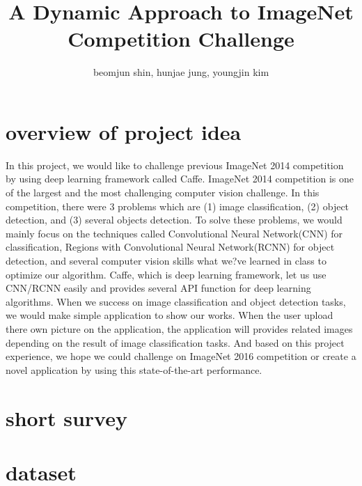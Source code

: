 

\title{A Dynamic Approach to ImageNet Competition Challenge}
\author{beomjun shin, hunjae jung, youngjin kim}

\newtheorem{qu}{Question}



\maketitle

\section{overview of project idea}

In this project, we would like to challenge previous ImageNet 2014 competition by using deep learning framework called Caffe. ImageNet 2014 competition is one of the largest and the most challenging computer vision challenge. In this competition, there were 3 problems which are (1) image classification, (2) object detection, and (3) several objects detection. To solve these problems, we would mainly focus on the techniques called Convolutional Neural Network(CNN) for classification, Regions with Convolutional Neural Network(RCNN) for object detection, and several computer vision skills what we?ve learned in class to optimize our algorithm. Caffe, which is deep learning framework, let us use CNN/RCNN easily and provides several API function for deep learning algorithms. When we success on image classification and object detection tasks, we would make simple application to show our works. When the user upload there own picture on the application, the application will provides related images depending on the result of image classification tasks. And based on this project experience, we hope we could challenge on ImageNet 2016 competition or create a novel application by using this state-of-the-art performance.

\section{short survey}

\section{dataset}


